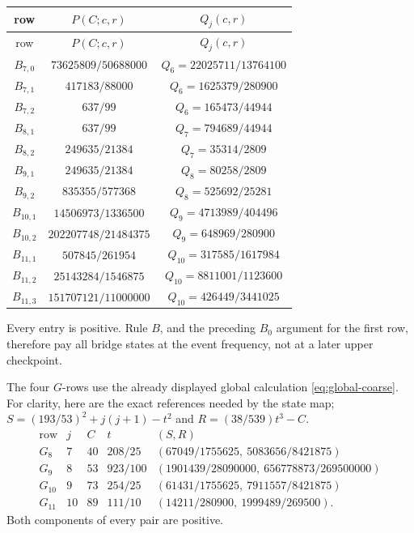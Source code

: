 \documentclass[11pt]{article}
\begin{document}
\begingroup
\small
\renewcommand{\arraystretch}{1.12}
\begin{longtable}{@{}c c c@{}}
\toprule
row&\(P(C;c,r)\)&\(Q_j(c,r)\)\\
\midrule
\endfirsthead
\toprule
row&\(P(C;c,r)\)&\(Q_j(c,r)\)\\
\midrule
\endhead
\(B_{7,0}\)&\(73625809/50688000\)&\(Q_6=22025711/13764100\)\\
\(B_{7,1}\)&\(417183/88000\)&\(Q_6=1625379/280900\)\\
\(B_{7,2}\)&\(637/99\)&\(Q_6=165473/44944\)\\
\(B_{8,1}\)&\(637/99\)&\(Q_7=794689/44944\)\\
\(B_{8,2}\)&\(249635/21384\)&\(Q_7=35314/2809\)\\
\(B_{9,1}\)&\(249635/21384\)&\(Q_8=80258/2809\)\\
\(B_{9,2}\)&\(835355/577368\)&\(Q_8=525692/25281\)\\
\(B_{10,1}\)&\(14506973/1336500\)&\(Q_9=4713989/404496\)\\
\(B_{10,2}\)&\(202207748/21484375\)&\(Q_9=648969/280900\)\\
\(B_{11,1}\)&\(507845/261954\)&\(Q_{10}=317585/1617984\)\\
\(B_{11,2}\)&\(25143284/1546875\)&\(Q_{10}=8811001/1123600\)\\
\(B_{11,3}\)&\(151707121/11000000\)&\(Q_{10}=426449/3441025\)\\
\bottomrule
\end{longtable}
\endgroup
Every entry is positive.  Rule \(B\), and the preceding \(B_0\) argument
for the first row, therefore pay all bridge states at the event frequency,
not at a later upper checkpoint.

The four \(G\)-rows use the already displayed global calculation
\eqref{eq:global-coarse}.  For clarity, here are the exact references
needed by the state map; \(S=(193/53)^2+j(j+1)-t^2\) and
\(R=(38/539)t^3-C\).
\begin{equation}
\begin{array}{c|c|c|c|c}
\text{row}&j&C&t&(S,R)\\ \hline
G_8&7&40&208/25&(67049/1755625,\ 5083656/8421875)\\
G_9&8&53&923/100&(1901439/28090000,\ 656778873/269500000)\\
G_{10}&9&73&254/25&(61431/1755625,\ 7911557/8421875)\\
G_{11}&10&89&111/10&(14211/280900,\ 1999489/269500).
\end{array}
\label{eq:event-global-four}
\end{equation}
Both components of every pair are positive.
\end{document}

